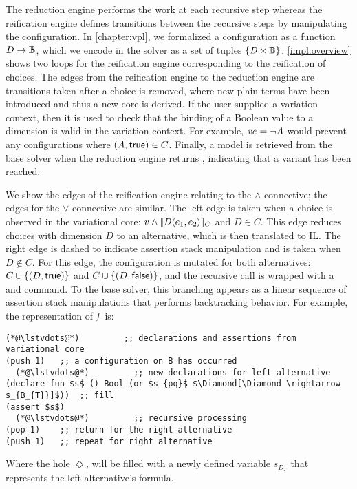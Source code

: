 \label{section:vsat:solving}
%
The reduction engine performs the work at each recursive step whereas the
reification engine defines transitions between the recursive steps by
manipulating the configuration. In \autoref{chapter:vpl}, we formalized
a configuration as a function $D\to\mathbb{B}{}$, which we encode in the solver
as a set of tuples $\{\mathit{D \times \mathbb{B}}\}$.
%
\autoref{impl:overview} shows two loops for the reification engine corresponding
to the reification of choices. The edges from the reification engine to the
reduction engine are transitions taken after a choice is removed, where new
plain terms have been introduced and thus a new core is derived. If the user
supplied a variation context, then it is used to check that the binding of a
Boolean value to a dimension is valid in the variation context. For example,
$\mathit{vc}_{} = \neg A$ would prevent any configurations where $\kf{(A,\true)} \in C$.
Finally, a model is retrieved from the base solver when the reduction engine
returns \unit{}, indicating that a variant has been reached.

We show the edges of the reification engine relating to the $\wedge$ connective;
the edges for the $\vee$ connective are similar. The left edge is taken when a
choice is observed in the variational core: $v \wedge \sem[C]{\chc[D]{e_{1},
    e_{2}}}$ and $D \in C$. This edge reduces choices with dimension $D$ to an
alternative, which is then translated to IL. The right edge is dashed to
indicate assertion stack manipulation and is taken when $D \notin C$. For this
edge, the configuration is mutated for both alternatives: $C \cup \{(D,
\true)\}$ and $C \cup \{(D, \false)\}$, and the recursive call is wrapped with a
 and  command. To the base solver, this branching appears as a
linear sequence of assertion stack manipulations that performs backtracking
behavior. For example, the representation of $\mathit{f}$ is:
%
\begin{lstlisting}[columns=flexible,keepspaces=true,language=SMTLIB]
  (*@\lstvdots@*)         ;; declarations and assertions from variational core
(push 1)   ;; a configuration on B has occurred
  (*@\lstvdots@*)         ;; new declarations for left alternative
(declare-fun $s$ () Bool (or $s_{pq}$ $\Diamond[\Diamond \rightarrow s_{B_{T}}]$))  ;; fill
(assert $s$)
  (*@\lstvdots@*)         ;; recursive processing
(pop 1)    ;; return for the right alternative
(push 1)   ;; repeat for right alternative
\end{lstlisting}
%
Where the hole $\Diamond$, will be filled with a newly defined variable
$s_{D_{T}}$ that represents the left alternative's formula.

